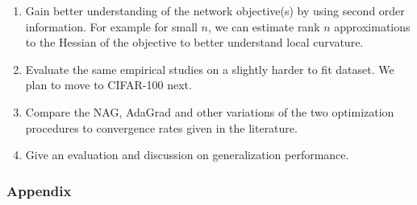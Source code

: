 \documentclass[12pt,english]{article}
\newcommand{\1}{\mathbb{I}} %
\begin{document}
\begin{enumerate}

\item Gain better understanding of the network objective(s) by using second
order information.  For example for small $n$, we can estimate rank $n$
approximations to the Hessian of the objective to better understand local
curvature.

\item Evaluate the same empirical studies on a slightly harder to fit dataset.
We plan to move to CIFAR-100 next.

\item Compare the NAG, AdaGrad and other variations of the two optimization
procedures to convergence rates given in the literature.

\item Give an evaluation and discussion on generalization performance.

\end{enumerate}

\subsubsection*{Appendix}

\showthe\columnwidth

{}

\end{document}
